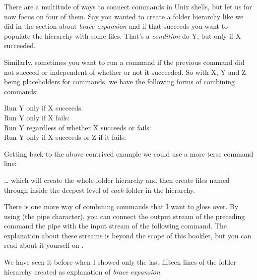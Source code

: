 \documentclass{olli-handout}
\begin{document}
\begin{refmanbash}
\end{refmanbash}

There are a multitude of ways to connect commands in Unix shells, but let us for now focus on four of them. Say you wanted to create a folder hierarchy like we did in the section about \emph{brace expansion} and if that succeeds you want to populate the hierarchy with some files. That's a \emph{condition} do Y, but only if X succeeded.

Similarly, sometimes you want to run a command if the previous command did not succeed or independent of whether or not it succeeded. So with X, Y and Z being placeholders for commands, we have the following forms of combining commands:

\begin{description}
	\item[Run Y only if X succeeds:] 
	\item[Run Y only if X fails:] 
	\item[Run Y regardless of whether X succeeds or fails:] 
	\item[Run Y only if X succeeds or Z if it fails:] 
\end{description}

Getting back to the above contrived example we could use a more terse command line:


\ldots{} which will create the whole folder hierarchy and then create files named  through  inside the deepest level of \emph{each} folder in the hierarchy.

There is one more way of combining commands that I want to gloss over. By using \TTQ{\textbar} (the pipe character), you can connect the output stream of the preceding command the pipe with the input stream of the following command. The explanation about these streams is beyond the scope of this booklet, but you can read about it yourself on \label{stdstreams}.

We have seen it before when I showed only the last fifteen lines of the folder hierarchy created as explanation of \emph{brace expansion}.
\end{document}
